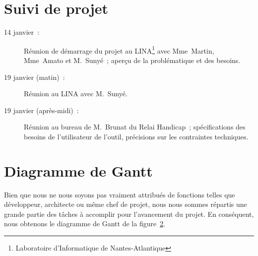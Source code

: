\appendix

\chapter{Suivi de projet}

\begin{description}
\item[14 janvier~:] Réunion de démarrage du projet au LINA\footnote{Laboratoire d'Informatique de Nantes-Atlantique} avec Mme~Martin, Mme~Amato et M.~Sunyé~; aperçu de la problématique et des besoins.
\item[19 janvier (matin)~:] Réunion au LINA avec M.~Sunyé.
\item[19 janvier (après-midi)~:] Réunion au bureau de M.~Brunat du Relai Handicap~; spécifications des besoins de l'utilisateur de l'outil, précisions sur les contraintes techniques.
\end{description}


\chapter{Diagramme de Gantt}

Bien que nous ne nous soyons pas vraiment attribués de fonctions telles que développeur, architecte ou même chef de projet, nous nous sommes répartis une grande partie des tâches à accomplir pour l'avancement du projet.
En conséquent, nous obtenons le diagramme de Gantt de la figure~\ref{}. %


\printindex
